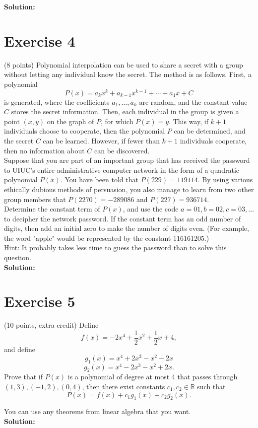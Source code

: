 \documentclass{article}
\begin{document}
\textbf{Solution:} \\



\newpage

\section*{Exercise 4}
(8 points) Polynomial interpolation can be used to share a secret with a group without letting any individual know the secret. The method is as follows. First, a polynomial
\[
P(x) = a_k x^k + a_{k-1}x^{k-1} + \cdots + a_1 x + C
\]
is generated, where the coefficients $a_1, \ldots, a_k$ are random, and the constant value $C$ stores the secret information. Then, each individual in the group is given a point $(x, y)$ on the graph of $P$, for which $P(x) = y$. This way, if $k + 1$ individuals choose to cooperate, then the polynomial $P$ can be determined, and the secret $C$ can be learned. However, if fewer than $k + 1$ individuals cooperate, then no information about $C$ can be discovered. \\

Suppose that you are part of an important group that has received the password to UIUC's entire administrative computer network in the form of a quadratic polynomial $P(x)$. You have been told that $P(229) = 119114$. By using various ethically dubious methods of persuasion, you also manage to learn from two other group members that $P(2270) = -289086$ and $P(227) = 936714$. \\

Determine the constant term of $P(x)$, and use the code $a = 01, b = 02, c = 03, \ldots$ to decipher the network password. If the constant term has an odd number of digits, then add an initial zero to make the number of digits even. (For example, the word "apple" would be represented by the constant 116161205.) \\

Hint: It probably takes less time to guess the password than to solve this question. \\

\textbf{Solution:} \\



\newpage

\section*{Exercise 5}
(10 points, extra credit) Define
\[
f(x) = -2x^4 + \frac{1}{2}x^2 + \frac{1}{2}x + 4,
\]
and define
\[
g_1(x) = x^4 + 2x^3 - x^2 - 2x
\]
\[
g_2(x) = x^4 - 2x^3 - x^2 + 2x.
\]
Prove that if $P(x)$ is a polynomial of degree at most 4 that passes through $(1,3), (-1,2), (0,4)$, then there exist constants $c_1, c_2 \in \mathbb{R}$ such that
\[
P(x) = f(x) + c_1 g_1(x) + c_2 g_2(x).
\]

You can use any theorems from linear algebra that you want. \\

\textbf{Solution:} \\
\end{document}
